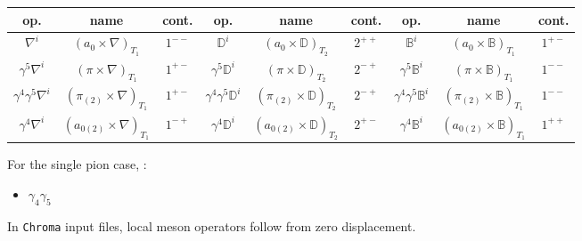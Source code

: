 \begin{tabular}{ccc|ccc|ccc}
    op. & name & cont.  & op. & name & cont. & op. & name & cont.\\
    \hline
    $\nabla^i$ & $(a_0 \times \nabla)_{T_1}$ & $1^{--}$ & $\mathbb{D}^i $ & $(a_0
    \times \mathbb{D})_{T_2}$ & $2^{++}$ & $\mathbb{B}^i$ & $(a_0
    \times \mathbb{B})_{T_1}$ & $1^{+-}$ \\
    $\gamma^5 \nabla^i$ & $(\pi \times \nabla)_{T_1}$ & $1^{+-}$  &
    $\gamma^5 \mathbb{D}^i $ & $(\pi
    \times \mathbb{D})_{T_2}$ & $2^{-+}$ & $\gamma^5 \mathbb{B}^i$ & $(\pi
    \times \mathbb{B})_{T_1}$ & $1^{--}$ \\
    $\gamma^4 \gamma^5 \nabla^i$ & $(\pi_{(2)} \times \nabla)_{T_1}$ &
    $1^{+-}$ & $\gamma^4 \gamma^5 \mathbb{D}^i $ & $(\pi_{(2)}
    \times \mathbb{D})_{T_2}$ & $2^{-+}$ & $\gamma^4 \gamma^5 \mathbb{B}^i$ & $(\pi_{(2)}
    \times \mathbb{B})_{T_1}$ & $1^{--}$ \\
    $\gamma^4 \nabla^i$ & $(a_{0(2)} \times \nabla)_{T_1}$ & $1^{-+}$ &
    $\gamma^4 \mathbb{D}^i $ & $(a_{0(2)}
    \times \mathbb{D})_{T_2}$ & $2^{+-}$ & $\gamma^4 \mathbb{B}^i$ & $(a_{0(2)}
    \times \mathbb{B})_{T_1}$ & $1^{++}$ \\

\end{tabular}


For the single pion case, : 
\begin{itemize}
    \item $\gamma_4\gamma_5$

\end{itemize}
In \texttt{Chroma} input files, local meson operators follow from zero displacement. 

